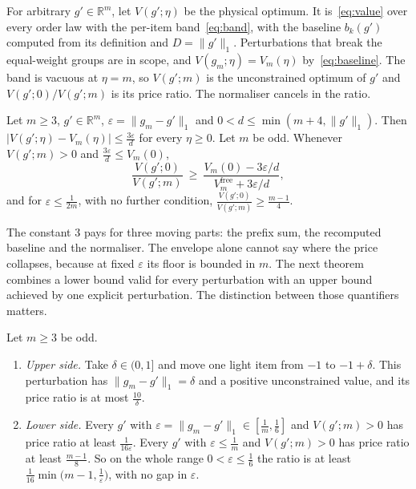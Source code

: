 For arbitrary $g'\in\mathbb{R}^{m}$, let $V(g';\eta)$ be the physical optimum. It
is~\eqref{eq:value} over every order law with the per-item band~\eqref{eq:band}, with the
baseline $b_{k}(g')$ computed from its definition and $D=\|g'\|_{1}$. Perturbations that break
the equal-weight groups are in scope, and $V(g_{m};\eta)=V_{m}(\eta)$
by~\eqref{eq:baseline}. The band is vacuous at $\eta=m$, so $V(g';m)$ is the unconstrained
optimum of $g'$ and $V(g';0)/V(g';m)$ is its price ratio. The normaliser cancels in the
ratio.

\begin{theorem}[Envelope]
\label{thm:robust}
Let $m\ge3$, $g'\in\mathbb{R}^{m}$, $\varepsilon=\|g_{m}-g'\|_{1}$ and
$0<d\le\min(m+4,\|g'\|_{1})$. Then $|V(g';\eta)-V_{m}(\eta)|\le\frac{3\varepsilon}{d}$ for
every $\eta\ge0$. Let $m$ be odd. Whenever $V(g';m)>0$ and $\frac{3\varepsilon}{d}\le V_{m}(0)$,
\[
\frac{V(g';0)}{V(g';m)}\ \ge\ \frac{V_{m}(0)-3\varepsilon/d}{V^{\mathrm{free}}_{m}+3\varepsilon/d},
\]
and for $\varepsilon\le\frac{1}{2m}$, with no further condition,
$\frac{V(g';0)}{V(g';m)}\ge\frac{m-1}{4}$.
\end{theorem}


The constant $3$ pays for three moving parts: the prefix sum, the recomputed baseline and the
normaliser. The envelope alone cannot say where the price collapses, because at fixed
$\varepsilon$ its floor is bounded in $m$. The next theorem combines a lower bound valid for every perturbation with an upper bound
achieved by one explicit perturbation. The distinction between those quantifiers matters.

\begin{theorem}
\label{thm:collapse}
Let $m\ge3$ be odd.
\begin{enumerate}
\item[(a)] \emph{Upper side.} Take $\delta\in(0,1]$ and move one light item from $-1$ to
$-1+\delta$. This perturbation has $\|g_{m}-g'\|_{1}=\delta$ and a positive unconstrained
value, and its price ratio is at most $\frac{10}{\delta}$.
\item[(b)] \emph{Lower side.} Every $g'$ with $\varepsilon=\|g_{m}-g'\|_{1}\in[\frac1m,\frac16]$
and $V(g';m)>0$ has price ratio at least $\frac{1}{16\varepsilon}$. Every $g'$ with
$\varepsilon\le\frac1m$ and $V(g';m)>0$ has price ratio at least $\frac{m-1}{8}$. So on the
whole range $0<\varepsilon\le\frac16$ the ratio is at least
$\frac1{16}\min\bigl(m-1,\frac1\varepsilon\bigr)$, with no gap in $\varepsilon$.
\end{enumerate}
\end{theorem}

